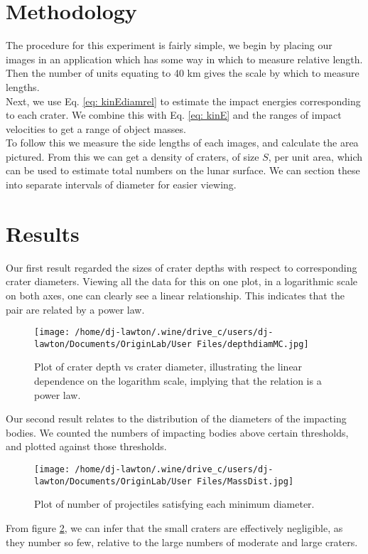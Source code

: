 \documentclass{article}
\begin{document}
\section{Methodology}
The procedure for this experiment is fairly simple, we begin by placing our images in an application which has some way in which to measure relative length. Then the number of units equating to 40 km gives the scale by which to measure lengths.\\
\indent Next, we use Eq. \ref{eq: kinEdiamrel} to estimate the impact energies corresponding to each crater. We combine this with Eq. \ref{eq: kinE} and the ranges of impact velocities to get a range of object masses.\\
\indent To follow this we measure the side lengths of each images, and calculate the area pictured. From this we can get a density of craters, of size $S$, per unit area, which can be used to estimate total numbers on the lunar surface. We can section these into separate intervals of diameter for easier viewing.
\section{Results}
Our first result regarded the sizes of crater depths with respect to corresponding crater diameters. Viewing all the data for this on one plot, in a logarithmic scale on both axes, one can clearly see a linear relationship. This indicates that the pair are related by a power law.\\
\begin{figure}[H]
\begin{center}
\texttt{[image: /home/dj-lawton/.wine/drive\_c/users/dj-lawton/Documents/OriginLab/User Files/depthdiamMC.jpg]}
\caption{\label{fig: DepthvsDiam} Plot of crater depth vs crater diameter, illustrating the linear dependence on the logarithm scale, implying that the relation is a power law.}
\end{center}
\end{figure}
\indent Our second result relates to the distribution of the diameters of the impacting bodies. We counted the numbers of impacting bodies above certain thresholds, and plotted against those thresholds.
\begin{figure}[H]
\begin{center}
\texttt{[image: /home/dj-lawton/.wine/drive\_c/users/dj-lawton/Documents/OriginLab/User Files/MassDist.jpg]}
\caption{\label{fig: NvsMinDiam}Plot of number of projectiles satisfying each minimum diameter.}
\end{center}
\end{figure}
From figure \ref{fig: NvsMinDiam}, we can infer that the small craters are effectively negligible, as they number so few, relative to the large numbers of moderate and large craters.
\end{document}
